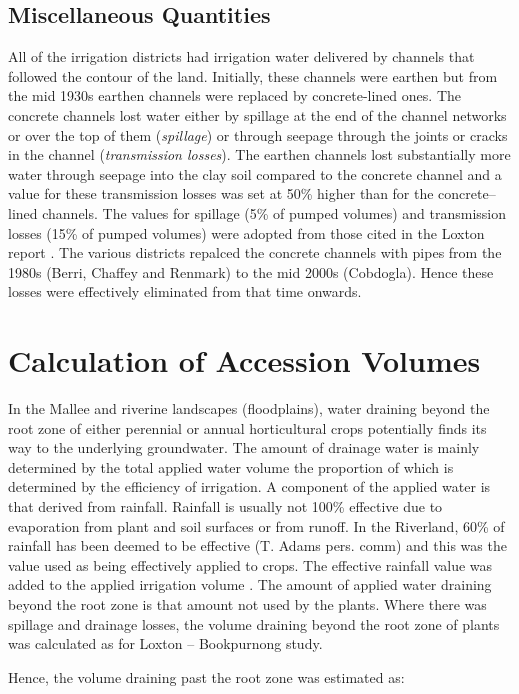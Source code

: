 \documentclass[a4paper, titlepage, 12pt]{article}\usepackage[]{graphicx}\usepackage[]{color}
\begin{document}
\begin{sffamily}
\subsection{Miscellaneous Quantities}
All of the irrigation districts had irrigation water delivered by channels that followed the contour of the land. Initially, these channels were earthen but from the mid 1930s earthen channels were replaced by concrete-lined ones. The concrete channels lost water either by spillage at the end of the channel networks or over the top of them (\textit{spillage}) or through seepage through the joints or cracks in the channel (\textit{transmission losses}). The earthen channels lost substantially more water through seepage into the clay soil compared to the concrete channel and a value for these transmission losses was set at 50\% higher than for the concrete--lined channels. The values for spillage (5\% of pumped volumes) and transmission losses (15\% of pumped volumes) were adopted from those cited in the Loxton report \citep{Meissner2011a}.  The various districts repalced the concrete channels with pipes from the 1980s (Berri, Chaffey and Renmark) to the mid 2000s (Cobdogla). Hence these losses were effectively eliminated from that time onwards.

\section{Calculation of Accession Volumes}
In the Mallee and riverine landscapes (floodplains), water draining beyond the root zone of either perennial or annual horticultural crops potentially finds its way to the underlying groundwater. The amount of drainage water is mainly determined by the total applied water volume the proportion of which is determined by the efficiency of irrigation. A component of the applied water is that derived from rainfall.  Rainfall is usually not 100\% effective due to evaporation from plant and soil surfaces \citep{Dastane} or from runoff.  In the Riverland, 60\% of rainfall has been deemed to be effective (T. Adams pers. comm) and this was the value used as being effectively applied to crops. The effective rainfall value was added to the applied irrigation volume \citep{Meissner2011b}.  The amount of applied water draining beyond the root zone is that amount not used by the plants.  Where there was spillage and drainage losses, the volume draining beyond the root zone of plants was calculated as for Loxton -- Bookpurnong study\citep{Meissner2011a}.

Hence, the volume draining past the root zone was estimated as:


\end{sffamily}
\end{document}
